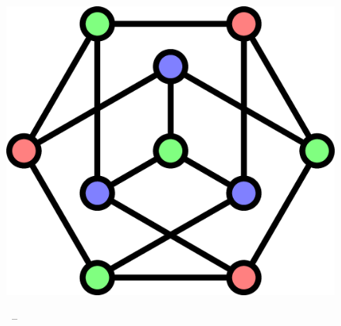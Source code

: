\begin{titlepage}
\pagecolor{amber}\afterpage{\nopagecolor}
	\begin{addmargin}[-1cm]{-1cm}
    \begin{center}
        \large  

        \hfill

        \vfill

        \begingroup
            \color{Maroon}\spacedallcaps{\LARGE\myTitle} \\ \bigskip
        \endgroup

        \spacedlowsmallcaps{\mySubtitle}

        \vfill

        \includegraphics[width=11cm]{petersen.png} %
				\vfill
        \myName \\ \medskip   

        \myMonth \xspace \myYear \ -- \verzija

        \vfill                      

    \end{center}  
  \end{addmargin}       
\end{titlepage}   
